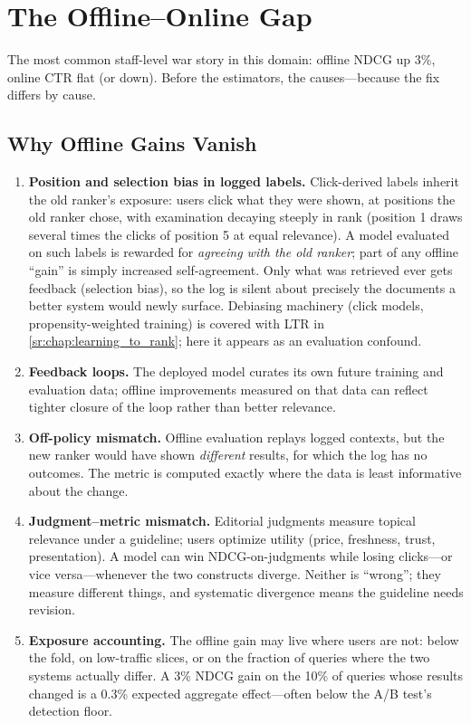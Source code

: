 \section{The Offline--Online Gap}
\label{sr:sec:eval_offline_online_gap}

The most common staff-level war story in this domain: offline NDCG up 3\%, online CTR flat (or down). Before the estimators, the causes---because the fix differs by cause.

\subsection{Why Offline Gains Vanish}

\begin{enumerate}
    \item \textbf{Position and selection bias in logged labels.} Click-derived labels inherit the old ranker's exposure: users click what they were shown, at positions the old ranker chose, with examination decaying steeply in rank (position 1 draws several times the clicks of position 5 at equal relevance). A model evaluated on such labels is rewarded for \textit{agreeing with the old ranker}; part of any offline ``gain'' is simply increased self-agreement. Only what was retrieved ever gets feedback (selection bias), so the log is silent about precisely the documents a better system would newly surface. Debiasing machinery (click models, propensity-weighted training) is covered with LTR in \ref{sr:chap:learning_to_rank}; here it appears as an evaluation confound.
    \item \textbf{Feedback loops.} The deployed model curates its own future training and evaluation data; offline improvements measured on that data can reflect tighter closure of the loop rather than better relevance.
    \item \textbf{Off-policy mismatch.} Offline evaluation replays logged contexts, but the new ranker would have shown \textit{different} results, for which the log has no outcomes. The metric is computed exactly where the data is least informative about the change.
    \item \textbf{Judgment--metric mismatch.} Editorial judgments measure topical relevance under a guideline; users optimize utility (price, freshness, trust, presentation). A model can win NDCG-on-judgments while losing clicks---or vice versa---whenever the two constructs diverge. Neither is ``wrong''; they measure different things, and systematic divergence means the guideline needs revision.
    \item \textbf{Exposure accounting.} The offline gain may live where users are not: below the fold, on low-traffic slices, or on the fraction of queries where the two systems actually differ. A 3\% NDCG gain on the 10\% of queries whose results changed is a 0.3\% expected aggregate effect---often below the A/B test's detection floor.
\end{enumerate}


